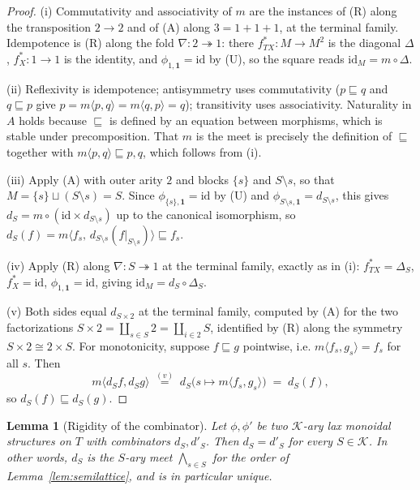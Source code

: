 \documentclass{article}
\newtheorem{lemma}{Lemma}
\newcommand{\K}{\mathcal{K}}
\newcommand{\id}{\mathrm{id}}
\begin{document}
\begin{proof}
(i) Commutativity and associativity of $m$ are the instances of (R) along the
transposition $2\to2$ and of (A) along $3=1+1+1$, at the terminal family.
Idempotence is (R) along the fold $\nabla\colon 2\twoheadrightarrow 1$: there
$f^{*}_{TX}\colon M\to M^{2}$ is the diagonal $\Delta$, $f^{*}_X\colon 1\to1$ is
the identity, and $\phi_{1,\mathbf 1}=\id$ by (U), so the square reads
$\id_M = m\circ\Delta$.

(ii) Reflexivity is idempotence; antisymmetry uses commutativity
($p\sqsubseteq q$ and $q\sqsubseteq p$ give $p=m\langle p,q\rangle=m\langle
q,p\rangle=q$); transitivity uses associativity. Naturality in $A$ holds because
$\sqsubseteq$ is defined by an equation between morphisms, which is stable under
precomposition. That $m$ is the meet is precisely the definition of
$\sqsubseteq$ together with $m\langle p,q\rangle\sqsubseteq p,q$, which follows
from (i).

(iii) Apply (A) with outer arity $2$ and blocks $\{s\}$ and $S\setminus s$, so
that $M=\{s\}\sqcup(S\setminus s)=S$. Since $\phi_{\{s\},\mathbf1}=\id$ by (U)
and $\phi_{S\setminus s,\mathbf1}=d_{S\setminus s}$, this gives
$d_S = m\circ(\id\times d_{S\setminus s})$ up to the canonical isomorphism, so
$d_S(f)=m\langle f_s,\,d_{S\setminus s}(f|_{S\setminus s})\rangle\sqsubseteq
f_s$.

(iv) Apply (R) along $\nabla\colon S\twoheadrightarrow 1$ at the terminal family,
exactly as in (i): $f^{*}_{TX}=\Delta_S$, $f^{*}_X=\id$, $\phi_{1,\mathbf1}=\id$,
giving $\id_M=d_S\circ\Delta_S$.

(v) Both sides equal $d_{S\times 2}$ at the terminal family, computed by (A) for
the two factorizations $S\times 2=\coprod_{s\in S}2=\coprod_{i\in 2}S$, identified
by (R) along the symmetry $S\times2\cong 2\times S$. For monotonicity, suppose
$f\sqsubseteq g$ pointwise, i.e. $m\langle f_s,g_s\rangle=f_s$ for all $s$. Then
\[
  m\langle d_S f, d_S g\rangle
  \;\overset{(v)}{=}\;
  d_S\bigl(s\mapsto m\langle f_s,g_s\rangle\bigr)
  \;=\;
  d_S(f),
\]
so $d_S(f)\sqsubseteq d_S(g)$.
\end{proof}

\begin{lemma}[Rigidity of the combinator]\label{lem:combinator}
Let $\phi,\phi'$ be two $\K$-ary lax monoidal structures on $T$ with combinators
$d_S,d'_S$. Then $d_S=d'_S$ for every $S\in\K$. In other words, $d_S$ is the
$S$-ary meet $\bigwedge_{s\in S}$ for the order of
Lemma~\ref{lem:semilattice}, and is in particular unique.
\end{lemma}
\end{document}
